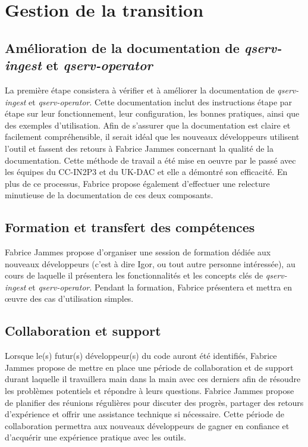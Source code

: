 \documentclass[french] {article}
\begin{document}
\section{Gestion de la transition}

\subsection{Amélioration de la documentation de \textit{qserv-ingest} et \textit{qserv-operator}}

La première étape consistera à vérifier et à améliorer la documentation de \textit{qserv-ingest} et \textit{qserv-operator}.
Cette documentation inclut des instructions étape par étape sur leur fonctionnement, leur configuration, les bonnes pratiques, ainsi que des exemples d'utilisation.
Afin de s'assurer que la documentation est claire et facilement compréhensible, il serait idéal que les nouveaux développeurs utilisent l'outil et fassent des retours à Fabrice Jammes concernant
la qualité de la documentation. Cette méthode de travail a été mise en oeuvre par le passé avec les équipes du CC-IN2P3 et du UK-DAC et elle a démontré son efficacité. En plus de ce processus,
Fabrice propose également d'effectuer une relecture minutieuse de la documentation de ces deux composants.

\subsection{Formation et transfert des compétences}

Fabrice Jammes propose d'organiser une session de formation dédiée aux nouveaux développeurs (c'est à dire Igor, ou tout autre personne intéressée), au cours de laquelle il présentera les fonctionnalités
et les concepts clés de \textit{qserv-ingest} et \textit{qserv-operator}. Pendant la formation, Fabrice présentera et mettra en œuvre des cas d'utilisation simples.

\subsection{Collaboration et support}

Lorsque le(s) futur(s) développeur(s) du code auront été identifiés, Fabrice Jammes propose de mettre en place une période de collaboration et de support durant laquelle il travaillera main dans la main
avec ces derniers afin de résoudre les problèmes potentiels et répondre à leurs questions. Fabrice Jammes propose de planifier des réunions régulières pour discuter des progrès, partager des retours
d'expérience et offrir une assistance technique si nécessaire. Cette période de collaboration permettra aux nouveaux développeurs de gagner en confiance et d'acquérir une expérience pratique avec les outils.
\end{document}
